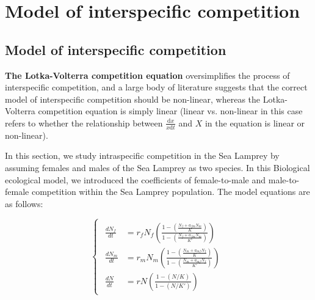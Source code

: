 \documentclass{mcmthesis}
\begin{document}
\section{Model of interspecific competition}

\subsection{Model of interspecific competition}
\textbf{The Lotka-Volterra competition equation} oversimplifies the process of interspecific competition,
and a large body of literature suggests that the correct model of interspecific competition should be non-linear,
whereas the Lotka-Volterra competition equation is simply linear
(linear vs. non-linear in this case refers to whether the relationship between $\frac{\mathrm{d} x}{x\mathrm{d} t} $ and $X$ in the equation is linear or non-linear).

In this section, we study intraspecific competition in the Sea Lamprey by assuming females and males of the Sea Lamprey as two species.
In this Biological ecological model, we introduced the coefficients of female-to-male and male-to-female competition within the Sea Lamprey population.
The model equations are as follows:

\begin{equation}
  \begin{cases}
    \begin{aligned}
      \frac{d N_{f}}{d t} & = r_{f} N_{f} \left( \frac{1 - \left( \frac{N_{f} + a_{fm} N_{m}}{K} \right)}{1 - \left( \frac{N_{f} + a_{fm} N_{m}}{K'} \right)} \right) \\
      \frac{d N_{m}}{d t} & = r_{m} N_{m} \left( \frac{1 - \left( \frac{N_{m} + a_{mf} N_{f}}{K} \right)}{1 - \left( \frac{N_{m} + a_{mf} N_{f}}{K'} \right)} \right) \\
      \frac{d N}{d t}     & = r N \left( \frac{1 - (N/K)}{1 - (N/K')} \right)
    \end{aligned}
  \end{cases}
\end{equation}
\end{document}
